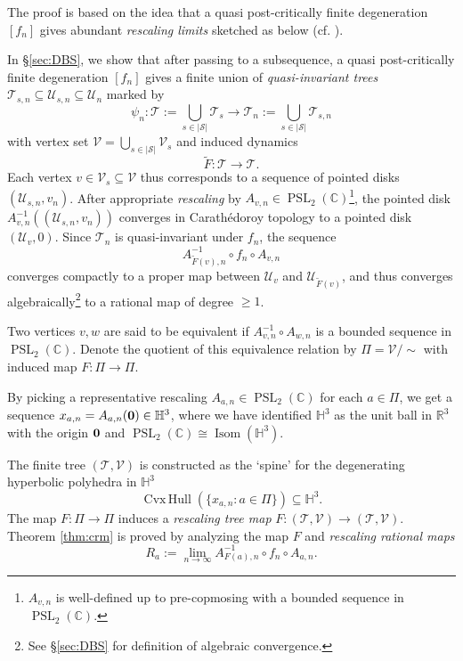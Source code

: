 \documentclass[11pt, reqno]{amsart}
\numberwithin{equation}{section}
\theoremstyle{plain}
\theoremstyle{theorem}
\theoremstyle{definition}
\newcommand{\R}{\mathbb{R}}
\newcommand{\C}{\mathbb{C}}
\newcommand{\Hyp}{\mathbb{H}}
\newcommand{\T}{\mathcal{T}}
\newcommand{\RT}{\mathscr{T}}
\newcommand{\RV}{\mathscr{V}}
\newcommand{\RP}{\Pi}
\newcommand{\U}{\mathcal{U}}
\DeclareMathOperator{\PSL}{PSL}
\DeclareMathOperator{\Isom}{Isom}
\DeclareMathOperator{\chull}{Cvx\, Hull}
\numberwithin{figure}{section}
\begin{document}
The proof is based on the idea that a quasi post-critically finite degeneration $[f_n]$ gives abundant {\em rescaling limits} sketched as below (cf. \cite{Kiwi15}).

In \S \ref{sec:DBS}, we show that after passing to a subsequence, a quasi post-critically finite degeneration $[f_n]$ gives a finite union of {\em quasi-invariant trees} $\T_{s,n} \subseteq \U_{s,n} \subseteq \U_n$ marked by
$$
\psi_n: \mathcal{T} := \bigcup_{s\in |\mathcal{S}|} \mathcal{T}_s \longrightarrow \mathcal{T}_n := \bigcup_{s\in |\mathcal{S}|} \mathcal{T}_{s,n}
$$
with vertex set $\mathcal{V} = \bigcup_{s\in |\mathcal{S}|} \mathcal{V}_s$ and induced dynamics
$$
\widetilde F: \mathcal{T} \longrightarrow \mathcal{T}.
$$
Each vertex $v\in \mathcal{V}_s \subseteq \mathcal{V}$ thus corresponds to a sequence of pointed disks $(\U_{s,n}, v_n)$.
After appropriate {\em rescaling} by $A_{v,n} \in \PSL_2(\C)$\footnote{$A_{v,n}$ is well-defined up to pre-copmosing with a bounded sequence in $\PSL_2(\C)$.}, the pointed disk $A_{v,n}^{-1}((\U_{s,n}, v_n))$ converges in Carath\'edoroy topology to a pointed disk $(\U_v, 0)$.
Since $\mathcal{T}_{n}$ is quasi-invariant under $f_n$, the sequence
$$
A_{\widetilde F(v),n}^{-1} \circ f_n \circ A_{v,n}
$$
converges compactly to a proper map between $\U_v$ and $\U_{\widetilde F(v)}$, and thus converges algebraically\footnote{See \S \ref{sec:DBS} for definition of algebraic convergence.} to a rational map of degree $\geq 1$.

Two vertices $v,w$ are said to be equivalent if $A_{v,n}^{-1} \circ A_{w,n}$ is a bounded sequence in $\PSL_2(\C)$.
Denote the quotient of this equivalence relation by $\RP = \mathcal{V} /\sim$ with induced map $F: \RP \rightarrow \RP$.

By picking a representative rescaling $A_{a,n} \in \PSL_2(\C)$ for each $a\in \RP$, we get a sequence $x_{a,n} = A_{a,n}({\bf 0}) \in \Hyp^3$, where we have identified $\Hyp^3$ as the unit ball in $\R^3$ with the origin ${\bf 0}$ and $\PSL_2(\C) \cong \Isom(\Hyp^3)$.

The finite tree $(\RT, \RV)$ is constructed as the `spine' for the degenerating hyperbolic polyhedra in $\Hyp^3$
$$
\chull(\{x_{a,n}: a\in \RP\}) \subseteq \Hyp^3.
$$
The map $F: \RP \rightarrow \RP$ induces a {\em rescaling tree map} $F: (\RT, \RV) \longrightarrow (\RT, \RV)$.
Theorem \ref{thm:crm} is proved by analyzing the map $F$ and {\em rescaling rational maps} 
$$
R_a:=\lim_{n\to\infty} A_{F(a),n}^{-1} \circ f_n \circ A_{a,n}.
$$ 
\end{document}
